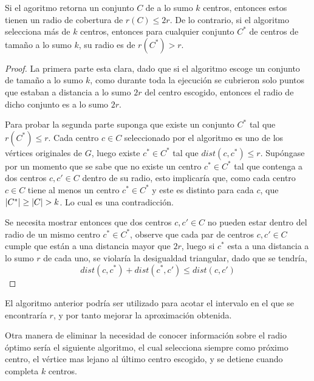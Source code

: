 \documentclass[../np-approximations.tex]{subfiles}
\begin{document}
\begin{theorem}
	\label{theorem:kcenter}
	Si el agoritmo retorna un conjunto $C$ de a lo sumo $k$ centros,
	entonces estos tienen un radio de cobertura de $r(C) \le 2r$. 
	De lo contrario, si el algoritmo selecciona más de $k$ centros, 
	entonces para cualquier conjunto $C^*$ de centros de tamaño a 
	lo sumo $k$, su radio es de $r(C^*)>r$.
\end{theorem}

\begin{proof}
	La primera parte esta clara, dado que si el algoritmo escoge un 
	conjunto de tamaño a lo sumo $k$, como durante toda la 
	ejecución se cubrieron solo puntos que estaban a distancia a lo 
	sumo $2r$ del centro escogido, entonces el radio de dicho 
	conjunto es a lo sumo $2r$.
		
	Para probar la segunda parte suponga que existe un conjunto 
	$C^*$ tal que $r(C^*) \le r$. Cada centro $c \in C$ 
	seleccionado por el algoritmo es uno de los vértices originales 
	de $G$, luego existe $c^* \in C^*$ tal que $dist(c,c^*)\le r$. 
	Supóngase por un momento que se sabe que no existe un centro 
	$c^* \in C^*$ tal que contenga a dos centros $c,c' \in C$ 
	dentro de su radio, esto implicaría que, como cada centro $c 
	\in C$ tiene al menos un centro $c^* \in C^*$ y este es 
	distinto para cada $c$, que $\left \vert C^* \right \vert \ge \left \vert C \right \vert > k$. Lo 
	cual es una contradicción.
		
	Se necesita mostrar entonces que dos centros $c,c' \in C$ no 
	pueden estar dentro del radio de un mismo centro $c^* \in C^*$,
	observe que cada par de centros $c,c' \in C$ cumple que están a 
	una distancia mayor que $2r$, luego si $c^*$ esta a una 
	distancia a lo sumo $r$ de cada uno, se violaría la desigualdad 
	triangular, dado que se tendría,
	$$dist(c,c^*)+dist(c^*,c') \le dist(c,c')$$
\end{proof}

El algoritmo anterior podría ser utilizado para acotar el intervalo 
en el que se encontraría $r$, y por tanto mejorar la aproximación 
obtenida.

Otra manera de eliminar la necesidad de conocer información sobre 
el radio óptimo sería el siguiente algoritmo, el cual selecciona 
siempre como próximo centro, el vértice mas lejano al último centro 
escogido, y se detiene cuando completa $k$ centros.
\end{document}
